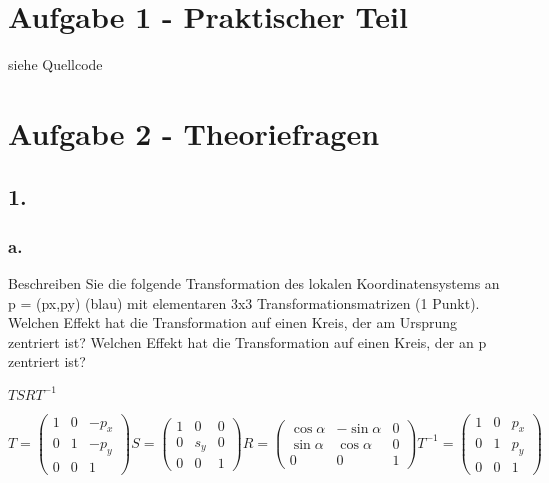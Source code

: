 \documentclass[12pt]{scrreprt}
\begin{document}


\chapter*{Aufgabe 1 - Praktischer Teil}

siehe Quellcode

\chapter*{Aufgabe 2 - Theoriefragen}
\section*{1.}

\subsection*{a.}
Beschreiben Sie die folgende Transformation des lokalen Koordinatensystems an p = (px,py) (blau) mit
elementaren 3x3 Transformationsmatrizen (1 Punkt). Welchen Effekt hat die Transformation auf einen
Kreis, der am Ursprung zentriert ist? Welchen Effekt hat die Transformation auf einen Kreis, der an p
zentriert ist?


\begin{center}
\(
T S R T^{-1}
\)
\end{center}

\(
T = \left(
	\begin{array}{ccc}
		1 & 0 & -p_{x} \\
		0 & 1 & -p_{y} \\
		0 & 0 & 1
	\end{array}
\right)
S = \left(
	\begin{array}{ccc}
		1 & 0 & 0 \\
		0 & s_{y} & 0 \\
		0 & 0 & 1
	\end{array}
\right)
R = \left(
	\begin{array}{ccc}
		\cos\alpha & -\sin\alpha & 0 \\
		\sin\alpha & \cos\alpha & 0 \\
		0 & 0 & 1
	\end{array}
\right)
T^{-1} = \left(
	\begin{array}{ccc}
		1 & 0 & p_{x} \\
		0 & 1 & p_{y} \\
		0 & 0 & 1
	\end{array}
\right)
\)
\end{document}
